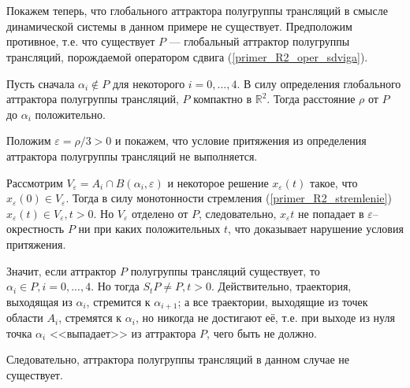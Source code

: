 \section{}

Покажем теперь, что глобального аттрактора полугруппы трансляций
в смысле динамической системы в данном примере не существует.
Предположим противное, т.е. что существует $P$ --- глобальный аттрактор полугруппы трансляций,
порождаемой оператором сдвига (\ref{primer_R2_oper_sdviga}).

Пусть сначала $\alpha_i \notin P$ для некоторого $i=0,...,4$.
В силу определения глобального аттрактора полугруппы трансляций,
$P$ компактно в $\mathbb{R}^2$.
Тогда расстояние $\rho$ от $P$ до $\alpha_i$ положительно.

Положим $\varepsilon = {\rho}/{3} > 0$ и покажем,
что условие притяжения из определения аттрактора полугруппы трансляций не выполняется.

Рассмотрим $V_\varepsilon = A_i \cap B(\alpha_i, \varepsilon)$ и некоторое решение $x_\varepsilon(t)$
такое, что $x_\varepsilon(0) \in V_\varepsilon$.
Тогда в силу монотонности стремления (\ref{primer_R2_stremlenie})
$x_\varepsilon(t) \in V_\varepsilon, t>0$.
Но $V_\varepsilon$ отделено от $P$, следовательно, $x_\varepsilon{t}$ не попадает в $\varepsilon$--окрестность $P$
ни при каких положительных $t$, что доказывает нарушение условия притяжения.

Значит, если аттрактор $P$ полугруппы трансляций существует, то $\alpha_i \in P, i=0,...,4$.
Но тогда $S_t P \ne P, t>0$.
Действительно, траектория, выходящая из $\alpha_i$, стремится к $\alpha_{i+1}$;
а все траектории, выходящие из точек области $A_i$, стремятся к $\alpha_i$,
но никогда не достигают её,
т.е. при выходе из нуля точка $\alpha_i$ <<выпадает>> из аттрактора $P$, чего быть не должно.

Следовательно, аттрактора полугруппы трансляций в данном случае не существует.
